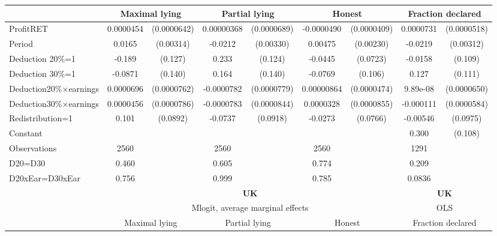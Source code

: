 \begin{tabular}{l|cccccc|cc}
                &\multicolumn{2}{c}{Maximal lying}&\multicolumn{2}{c}{Partial lying}&\multicolumn{2}{c}{Honest}  &\multicolumn{2}{c}{Fraction declared}\\
\hline
ProfitRET       &0.0000454         &(0.0000642)&0.00000368         &(0.0000689)&-0.0000490         &(0.0000409)&0.0000731         &(0.0000518)\\
Period          &   0.0165\sym{***}&(0.00314)&  -0.0212\sym{***}&(0.00330)&  0.00475\sym{**} &(0.00230)&  -0.0219\sym{***}&(0.00312)\\
Deduction 20\%=1&   -0.189         &  (0.127)&    0.233\sym{*}  &  (0.124)&  -0.0445         & (0.0723)&  -0.0158         &  (0.109)\\
Deduction 30\%=1&  -0.0871         &  (0.140)&    0.164         &  (0.140)&  -0.0769         &  (0.106)&    0.127         &  (0.111)\\
Deduction\space{}20\%$\times$\space{}earnings&0.0000696         &(0.0000762)&-0.0000782         &(0.0000779)&0.00000864         &(0.0000474)& 9.89e-08         &(0.0000650)\\
Deduction\space{}30\%$\times$\space{}earnings&0.0000456         &(0.0000786)&-0.0000783         &(0.0000844)&0.0000328         &(0.0000855)&-0.000111\sym{*}  &(0.0000584)\\
Redistribution=1&    0.101         & (0.0892)&  -0.0737         & (0.0918)&  -0.0273         & (0.0766)& -0.00546         & (0.0975)\\
Constant        &                  &         &                  &         &                  &         &    0.300\sym{***}&  (0.108)\\
\hline
Observations    &     2560         &         &     2560         &         &     2560         &         &     1291         &         \\
D20=D30         &    0.460         &         &    0.605         &         &    0.774         &         &    0.209         &         \\
D20xEar=D30xEar &    0.756         &         &    0.999         &         &    0.785         &         &   0.0836         &         \\
\hline\hline
&\multicolumn{6}{c|}{\bf UK}&\multicolumn{2}{c}{\bf UK}\\ &\multicolumn{6}{c|}{Mlogit, average marginal effects }&\multicolumn{2}{c}{OLS}\\
                &\multicolumn{2}{c}{Maximal lying}&\multicolumn{2}{c}{Partial lying}&\multicolumn{2}{c}{Honest}  &\multicolumn{2}{c}{Fraction declared}\\

\end{tabular}

